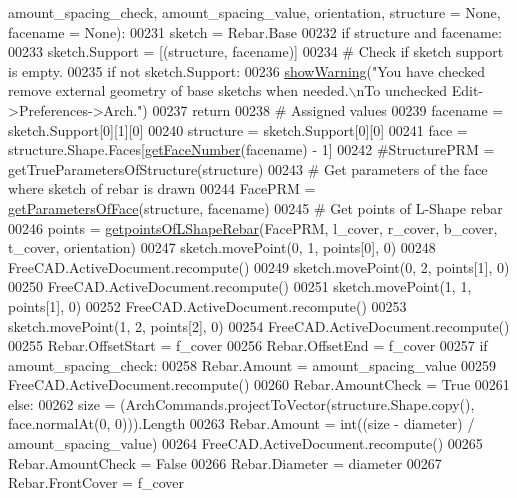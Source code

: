 \begin{DoxyCode}
      amount\_spacing\_check, amount\_spacing\_value, orientation, structure = None, facename = None):
00231     sketch = Rebar.Base
00232     \textcolor{keywordflow}{if} structure \textcolor{keywordflow}{and} facename:
00233         sketch.Support = [(structure, facename)]
00234     \textcolor{comment}{# Check if sketch support is empty.}
00235     \textcolor{keywordflow}{if} \textcolor{keywordflow}{not} sketch.Support:
00236         \hyperlink{namespaceRebarfunc_a2278a0602d46a62953af1fcf2e574a94}{showWarning}(\textcolor{stringliteral}{"You have checked remove external geometry of base sketchs when needed.\(\backslash\)nTo
       unchecked Edit->Preferences->Arch."})
00237         \textcolor{keywordflow}{return}
00238     \textcolor{comment}{# Assigned values}
00239     facename = sketch.Support[0][1][0]
00240     structure = sketch.Support[0][0]
00241     face = structure.Shape.Faces[\hyperlink{namespaceRebarfunc_a3885b3b63e3a41508ac79bc7550cf301}{getFaceNumber}(facename) - 1]
00242     \textcolor{comment}{#StructurePRM = getTrueParametersOfStructure(structure)}
00243     \textcolor{comment}{# Get parameters of the face where sketch of rebar is drawn}
00244     FacePRM = \hyperlink{namespaceRebarfunc_a92122b3d7cedd3d47bb63380a5ac4d08}{getParametersOfFace}(structure, facename)
00245     \textcolor{comment}{# Get points of L-Shape rebar}
00246     points = \hyperlink{namespaceLShapeRebar_a3019960c6f6476cb70df9ee06f330dfb}{getpointsOfLShapeRebar}(FacePRM, l\_cover, r\_cover, b\_cover, t\_cover, 
      orientation)
00247     sketch.movePoint(0, 1, points[0], 0)
00248     FreeCAD.ActiveDocument.recompute()
00249     sketch.movePoint(0, 2, points[1], 0)
00250     FreeCAD.ActiveDocument.recompute()
00251     sketch.movePoint(1, 1, points[1], 0)
00252     FreeCAD.ActiveDocument.recompute()
00253     sketch.movePoint(1, 2, points[2], 0)
00254     FreeCAD.ActiveDocument.recompute()
00255     Rebar.OffsetStart = f\_cover
00256     Rebar.OffsetEnd = f\_cover
00257     \textcolor{keywordflow}{if} amount\_spacing\_check:
00258         Rebar.Amount = amount\_spacing\_value
00259         FreeCAD.ActiveDocument.recompute()
00260         Rebar.AmountCheck = \textcolor{keyword}{True}
00261     \textcolor{keywordflow}{else}:
00262         size = (ArchCommands.projectToVector(structure.Shape.copy(), face.normalAt(0, 0))).Length
00263         Rebar.Amount = int((size - diameter) / amount\_spacing\_value)
00264         FreeCAD.ActiveDocument.recompute()
00265         Rebar.AmountCheck = \textcolor{keyword}{False}
00266     Rebar.Diameter = diameter
00267     Rebar.FrontCover = f\_cover

\end{DoxyCode}
